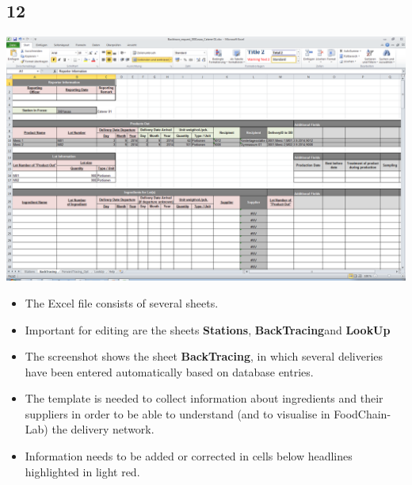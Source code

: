 \documentclass{beamer}
\begin{document}
\subsection{12}
\begin{frame}
	\begin{center}
  		\includegraphics[height=0.5\textheight]{12.png}
	\end{center}
	\begin{itemize}
		\item The Excel file consists of several sheets.
		\item Important for editing are the sheets \textbf{Stations}, \textbf{BackTracing}and \textbf{LookUp}
		\item The screenshot shows the sheet \textbf{BackTracing}, in which several deliveries have been entered automatically based on database entries.
		\item The template is needed to collect information about ingredients and their suppliers in order to be able to understand (and to visualise in FoodChain-Lab) the delivery network.
		\item Information needs to be added or corrected in cells below headlines highlighted in light red.
	\end{itemize}
\end{frame}
\end{document}
